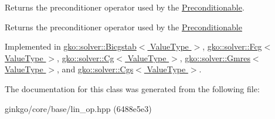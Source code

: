 Returns the preconditioner operator used by the \hyperlink{classgko_1_1Preconditionable}{Preconditionable}. 

\begin{DoxyReturn}{Returns}
the preconditioner operator used by the \hyperlink{classgko_1_1Preconditionable}{Preconditionable} 
\end{DoxyReturn}


Implemented in \hyperlink{classgko_1_1solver_1_1Bicgstab_ac16d32672fbc91d8cfd7c0607c9771db}{gko\+::solver\+::\+Bicgstab$<$ Value\+Type $>$}, \hyperlink{classgko_1_1solver_1_1Fcg_a2dec8d13548e8b316d6598c9ee8b0881}{gko\+::solver\+::\+Fcg$<$ Value\+Type $>$}, \hyperlink{classgko_1_1solver_1_1Cg_a797544ecc8d86d2798014e7f5f5baf4f}{gko\+::solver\+::\+Cg$<$ Value\+Type $>$}, \hyperlink{classgko_1_1solver_1_1Gmres_ac2e3e0024a37647eda9f8a7f5b4cefb4}{gko\+::solver\+::\+Gmres$<$ Value\+Type $>$}, and \hyperlink{classgko_1_1solver_1_1Cgs_ad349dc1381dfdcb7a47223908806dcc7}{gko\+::solver\+::\+Cgs$<$ Value\+Type $>$}.



The documentation for this class was generated from the following file\+:\begin{DoxyCompactItemize}
\item 
ginkgo/core/base/lin\+\_\+op.\+hpp (6488e5e3)\end{DoxyCompactItemize}
